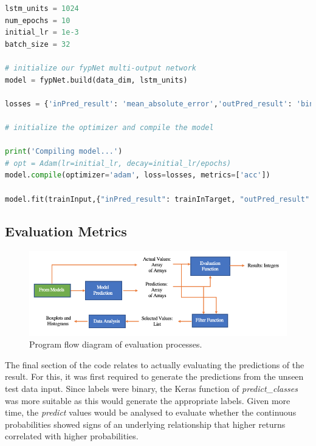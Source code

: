 \documentclass[10pt,onecolumn,letterpaper]{article}
\begin{document}
\begin{lstlisting}[language=Python, breaklines=true]
lstm_units = 1024
num_epochs = 10
initial_lr = 1e-3
batch_size = 32

# initialize our fypNet multi-output network
model = fypNet.build(data_dim, lstm_units)
 
losses = {'inPred_result': 'mean_absolute_error','outPred_result': 'binary_crossentropy'}
 
# initialize the optimizer and compile the model

print('Compiling model...')
# opt = Adam(lr=initial_lr, decay=initial_lr/epochs)
model.compile(optimizer='adam', loss=losses, metrics=['acc'])    

model.fit(trainInput,{"inPred_result": trainInTarget, "outPred_result": trainTarget}, validation_data=(valInput, {"inPred_result": trainValTarget, "outPred_result": valTarget}), batch_size = batch_size, Stateful=False, epochs=num_epochs, verbose=1)

\end{lstlisting} 

\subsection{Evaluation Metrics} 

\begin{figure}[!hbt!]
\centering
\includegraphics[width=\columnwidth]{evaluationflow.png}
\caption{Program flow diagram of evaluation processes.}
\label{evaluationflow}
\end{figure}

The final section of the code relates to actually evaluating the predictions of the result. For this, it was first required to generate the predictions from the unseen test data input. Since labels were binary, the Keras function of \textit{predict\_classes} was more suitable as this would generate the appropriate labels. Given more time, the \textit{predict} values would be analysed to evaluate whether the continuous probabilities showed signs of an underlying relationship that higher returns correlated with higher probabilities. 
\end{document}
